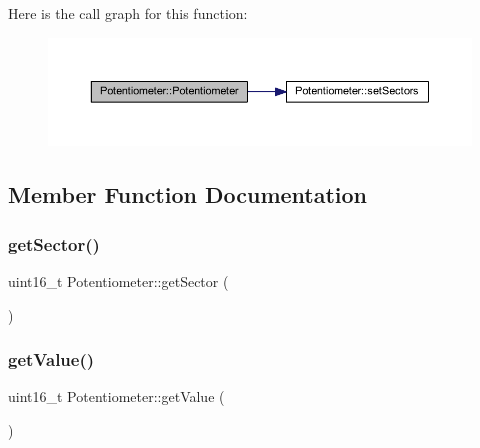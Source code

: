 Here is the call graph for this function\+:\nopagebreak
\begin{figure}[H]
\begin{center}
\leavevmode
\includegraphics[width=350pt]{class_potentiometer_af91e2477f31efbb3b7ebfedb427007ff_cgraph}
\end{center}
\end{figure}


\subsection{Member Function Documentation}
\mbox{\label{class_potentiometer_a5dabb56ce200afabd7cdf9cd4d0d3305}} 
\subsubsection{\texorpdfstring{get\+Sector()}{getSector()}}
{\footnotesize\ttfamily uint16\+\_\+t Potentiometer\+::get\+Sector (\begin{DoxyParamCaption}{ }\end{DoxyParamCaption})}

\mbox{\label{class_potentiometer_ac992f846228fddede6d86d6ffa1be9b6}} 
\subsubsection{\texorpdfstring{get\+Value()}{getValue()}}
{\footnotesize\ttfamily uint16\+\_\+t Potentiometer\+::get\+Value (\begin{DoxyParamCaption}{ }\end{DoxyParamCaption})}

